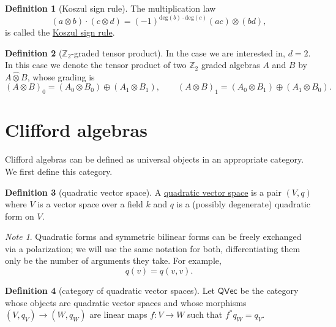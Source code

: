 \documentclass[a4paper]{report}
\newcommand{\Z}{\mathbb{Z}}
\newcommand{\defn}[1]{\ul{#1}}
\theoremstyle{definition}
\newtheorem{definition}{Definition}[section]
\theoremstyle{plain}
\theoremstyle{remark}
\newtheorem{note}{Note}[section]
\begin{document}
\begin{definition}[Koszul sign rule]
  \label{def:koszulsignrule}
  The multiplication law
  \begin{equation*}
    (a \otimes b)\cdot(c \otimes d) = (-1)^{\mathrm{deg}(b)\cdot\mathrm{deg}(c)}(ac)\otimes(bd),
  \end{equation*}
  is called the \defn{Koszul sign rule}.
\end{definition}

\begin{definition}[$\Z_2$-graded tensor product]
  \label{def:z2gradedtensorproduct}
  In the case we are interested in, $d = 2$. In this case we denote the tensor product of two $\Z_{2}$ graded algebras $A$ and $B$ by $A \hat{\otimes} B$, whose grading is
  \begin{equation*}
    (A \otimes B)_{0} = (A_{0}\otimes B_{0}) \oplus (A_{1} \otimes B_{1}),\qquad
    (A \otimes B)_{1} = (A_{0}\otimes B_{1}) \oplus (A_{1} \otimes B_{0}).
  \end{equation*}
\end{definition}


\section{Clifford algebras}
Clifford algebras can be defined as universal objects in an appropriate category. We first define this category.
\begin{definition}[quadratic vector space]
  \label{def:quadraticvectorspace}
  A \defn{quadratic vector space} is a pair $(V, q)$ where $V$ is a vector space over a field $k$ and $q$ is a (possibly degenerate) quadratic form on $V$.
\end{definition}
\begin{note}
  Quadratic forms and symmetric bilinear forms can be freely exchanged via a polarization; we will use the same notation for both, differentiating them only be the number of arguments they take. For example,
  \begin{equation*}
    q(v) = q(v,v).
  \end{equation*}
\end{note}

\begin{definition}[category of quadratic vector spaces]
  \label{def:categoryofquadraticvectorspaces}
  Let $\mathsf{QVec}$ be the category whose objects are quadratic vector spaces and whose morphisms $(V, q_{V}) \to (W, q_{W})$ are linear maps $f\colon V \to W$ such that $f^{*}q_{W} = q_{V}$.
\end{definition}
\end{document}

